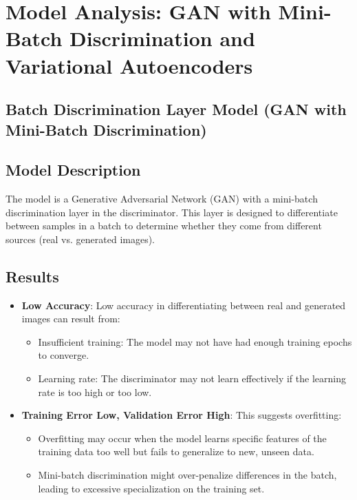 \documentclass{article}
\begin{document}
\section{Model Analysis: GAN with Mini-Batch Discrimination and Variational Autoencoders}


\subsection{Batch Discrimination Layer Model (GAN with Mini-Batch Discrimination)}
\subsection{Model Description}
The model is a Generative Adversarial Network (GAN) with a mini-batch discrimination layer in the discriminator. This layer is designed to differentiate between samples in a batch to determine whether they come from different sources (real vs. generated images).

\subsection{Results}

\begin{itemize}
    \item \textbf{Low Accuracy}: Low accuracy in differentiating between real and generated images can result from:
        \begin{itemize}
            \item Insufficient training: The model may not have had enough training epochs to converge.
            \item Learning rate: The discriminator may not learn effectively if the learning rate is too high or too low.
        \end{itemize}
    \item \textbf{Training Error Low, Validation Error High}: This suggests overfitting:
        \begin{itemize}
            \item Overfitting may occur when the model learns specific features of the training data too well but fails to generalize to new, unseen data.
            \item Mini-batch discrimination might over-penalize differences in the batch, leading to excessive specialization on the training set.
        \end{itemize}
\end{itemize}
\end{document}
